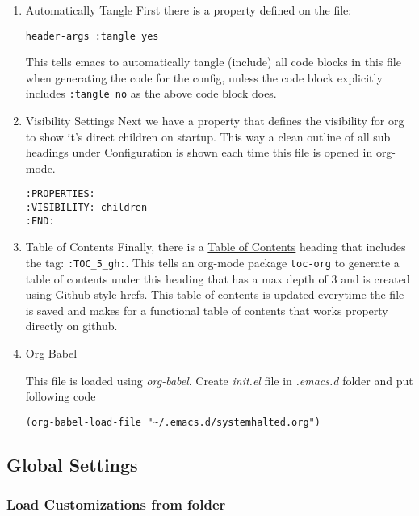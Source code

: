 \documentclass[11pt]{article}
\begin{document}
\begin{enumerate}
\item Automatically Tangle
\label{sec:org6a29750}
First there is a property defined on the file:

\begin{verbatim}
header-args :tangle yes
\end{verbatim}

This tells emacs to automatically tangle (include) all code blocks in this file when
generating the code for the config, unless the code block explicitly includes
\texttt{:tangle no} as the above code block does.

\item Visibility Settings
\label{sec:org83cdf90}
Next we have a property that defines the visibility for org to show it's direct children on startup. This way a clean outline of all
sub headings under Configuration is shown each time this file is opened in org-mode.

\begin{verbatim}
:PROPERTIES:
:VISIBILITY: children
:END:
\end{verbatim}

\item Table of Contents
\label{sec:org3066685}
Finally, there is a \hyperref[sec:org3066685]{Table of Contents} heading that includes the tag: \texttt{:TOC\_5\_gh:}. This
tells an org-mode package \texttt{toc-org} to generate a table of contents under this heading
that has a max depth of 3 and is created using Github-style hrefs. This table of contents
is updated everytime the file is saved and makes for a functional table of contents that
works property directly on github.

\item Org Babel
\label{sec:orged2f3a8}

This file is loaded using \emph{org-babel}. Create \emph{init.el} file in \emph{.emacs.d} folder and put following code

\begin{verbatim}
(org-babel-load-file "~/.emacs.d/systemhalted.org")
\end{verbatim}
\end{enumerate}



\subsection{Global Settings}
\label{sec:org2ad8875}
\subsubsection{Load Customizations from folder}
\label{sec:orgc964d7d}
\end{document}

